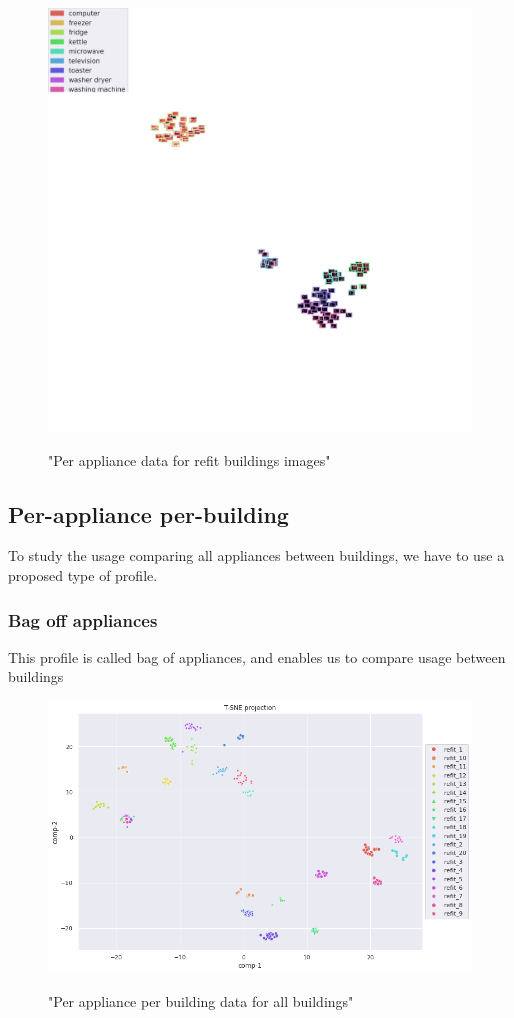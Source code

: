 \begin{figure}[H]
	\centering
	\caption{"Per appliance data for refit buildings images"}
	\includegraphics[width=.9\textwidth]{Figures/TSNE/TSNE_results/refit/img_scatter_refit8.png}
	\label{fig:tsne_papb_img_scatter_ent_refit8}
\end{figure}


\subsection{Per-appliance per-building}
To study the usage comparing all appliances between buildings,
we have to use a proposed type of profile.

\subsubsection{Bag off appliances}
This profile is called bag of appliances, and 
enables us to compare usage between buildings

\begin{figure}[H]
	\centering
	\caption{"Per appliance per building data for all buildings"}
	\includegraphics[width=.8\textwidth]{Figures/TSNE/TSNE_BOA/refit/scatter_refit_all.png}
	\label{fig:tsne_boa_scatter_refit8}
\end{figure}


